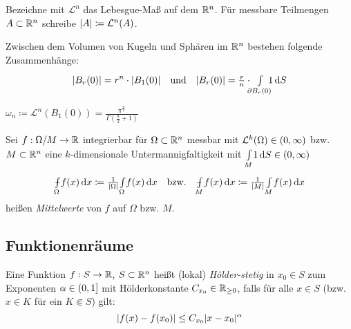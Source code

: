 \documentclass{cheat-sheet}
\def\Xint#1{\mathchoice
   {\XXint\displaystyle\textstyle{#1}}%
   {\XXint\textstyle\scriptstyle{#1}}%
   {\XXint\scriptstyle\scriptscriptstyle{#1}}%
   {\XXint\scriptscriptstyle\scriptscriptstyle{#1}}%
   \!\int}
\def\XXint#1#2#3{{\setbox0=\hbox{$#1{#2#3}{\int}$}
     \vcenter{\hbox{$#2#3$}}\kern-.5\wd0}}
\def\dashint{\Xint-}
\newcommand{\mymvint}[2]{{\textstyle \dashint\limits_{#1}^{#2}}}
\newcommand{\MVInt}[4]{\mymvint{#1}{#2} #3 \,\d #4}
\begin{document}
\begin{nota}
  Bezeichne mit $\mathcal{L}^n$ das Lebesgue-Maß auf dem $\mathbb{R}^n$. Für messbare Teilmengen $A \subset \mathbb{R}^n$ schreibe $\lvert A\rvert \coloneqq \mathcal{L}^n(A)$.
\end{nota}

\begin{bsp}
  Zwischen dem Volumen von Kugeln und Sphären im $\mathbb{R}^n$ bestehen folgende Zusammenhänge:
  \[
    \abs{B_r(0)} = r^n \cdot \abs{B_1(0)}
    \quad \text{und} \quad
    \abs{B_r(0)} = \tfrac{r}{n} \cdot \enspace\Int{\mathclap{\partial B_r(0)}}{}{\enspace1}{S}
  \]
\end{bsp}
\vspace{-12pt}
\begin{nota}
  $\omega_n \coloneqq \mathcal{L}^n(B_1(0)) = \frac{\pi^{\tfrac{n}{2}}}{\Gamma(\tfrac{n}{2} + 1)}$
\end{nota}

\begin{samepage}

\begin{nota}
  Sei $f : \Omega / M \to \mathbb{R}$ integrierbar für $\Omega \subset \mathbb{R}^n$ messbar mit $\mathcal{L}^k(\Omega) \in \left( 0, \infty \right)$ bzw. $M \subset \mathbb{R}^n$ eine $k$-dimensionale Untermannigfaltigkeit mit ${\textstyle \int\limits_{M}^{}} 1 \,\mathrm{d} S \in \left( 0, \infty \right)$
  \[
    \MVInt{\Omega}{}{f(x)}{x} \coloneqq \tfrac{1}{\abs{\Omega}} \Int{\Omega}{}{f(x)}{x}
    \quad \text{bzw.} \quad
    \MVInt{M}{}{f(x)}{x} \coloneqq \tfrac{1}{\abs{M}} \Int{M}{}{f(x)}{x}
  \]
  heißen \emph{Mittelwerte} von $f$ auf $\Omega$ bzw. $M$.
\end{nota}


\subsection{Funktionenräume}


\begin{defn}
  Eine Funktion $f : S \to \mathbb{R}$, $S \subset \mathbb{R}^n$ heißt (lokal) \emph{Hölder-stetig} in $x_0 \in S$ zum Exponenten $\alpha \in \left( 0, 1 \right]$ mit Hölderkonstante $C_{x_0} \in \mathbb{R}_{\geq 0}$, falls für alle $x \in S$ (bzw. $x \in K$ für ein $K \Subset S$) gilt:
  \[ \lvert f(x) - f(x_0)\rvert \leq C_{x_0} \lvert x - x_0\rvert^\alpha \]
\end{defn}

\end{samepage}
\end{document}
